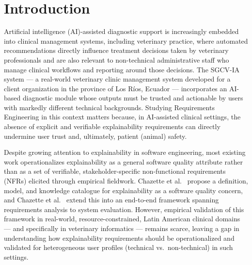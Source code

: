 \documentclass[pdflatex,sn-mathphys-num,Numbered]{sn-jnl}
\begin{document}

\maketitle


\section{Introduction}\label{sec1}

Artificial intelligence (AI)-assisted diagnostic support is increasingly embedded into clinical management systems, including veterinary practice, where automated recommendations directly influence treatment decisions taken by veterinary professionals and are also relevant to non-technical administrative staff who manage clinical workflows and reporting around those decisions. The SGCV-IA system --- a real-world veterinary clinic management system developed for a client organization in the province of Los R\'ios, Ecuador --- incorporates an AI-based diagnostic module whose outputs must be trusted and actionable by users with markedly different technical backgrounds. Studying Requirements Engineering in this context matters because, in AI-assisted clinical settings, the absence of explicit and verifiable explainability requirements can directly undermine user trust and, ultimately, patient (animal) safety.

Despite growing attention to explainability in software engineering, most existing work operationalizes explainability as a general software quality attribute rather than as a set of verifiable, stakeholder-specific non-functional requirements (NFRs) elicited through empirical fieldwork. Chazette et al.~\cite{chazette2021} propose a definition, model, and knowledge catalogue for explainability as a software quality concern, and Chazette et al.~\cite{chazette2022} extend this into an end-to-end framework spanning requirements analysis to system evaluation. However, empirical validation of this framework in real-world, resource-constrained, Latin American clinical domains --- and specifically in veterinary informatics --- remains scarce, leaving a gap in understanding how explainability requirements should be operationalized and validated for heterogeneous user profiles (technical vs.\ non-technical) in such settings.
\end{document}

